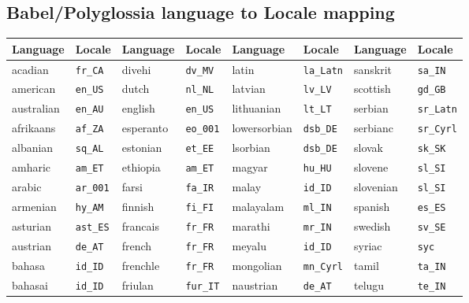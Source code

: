 \documentclass{ltxdockit}
\begin{document}
\subsection{Babel/Polyglossia language to Locale mapping}\label{localemap}

\begin{center}
\footnotesize
\begin{tabular}{alalalal}
\toprule
Language & Locale & Language & Locale & Language & Locale & Language & Locale\\
\midrule
acadian    & \texttt{fr\_CA}  & divehi      & \texttt{dv\_MV}  & latin           & \texttt{la\_Latn} & sanskrit        & \texttt{sa\_IN}\\
american   & \texttt{en\_US}  & dutch       & \texttt{nl\_NL}  & latvian         & \texttt{lv\_LV} &   scottish        & \texttt{gd\_GB}\\
australian & \texttt{en\_AU}  & english     & \texttt{en\_US}  & lithuanian      & \texttt{lt\_LT} &   serbian         & \texttt{sr\_Latn}\\ 
afrikaans  & \texttt{af\_ZA}  & esperanto   & \texttt{eo\_001} & lowersorbian    & \texttt{dsb\_DE} &  serbianc        & \texttt{sr\_Cyrl}\\ 
albanian   & \texttt{sq\_AL}  & estonian    & \texttt{et\_EE}  & lsorbian        & \texttt{dsb\_DE} &  slovak          & \texttt{sk\_SK}\\
amharic    & \texttt{am\_ET}  & ethiopia    & \texttt{am\_ET}  & magyar          & \texttt{hu\_HU} &   slovene         & \texttt{sl\_SI}\\
arabic     & \texttt{ar\_001} & farsi       & \texttt{fa\_IR}  & malay           & \texttt{id\_ID} &   slovenian       & \texttt{sl\_SI}\\
armenian   & \texttt{hy\_AM}  & finnish     & \texttt{fi\_FI}  & malayalam       & \texttt{ml\_IN} &   spanish         & \texttt{es\_ES}\\
asturian   & \texttt{ast\_ES} & francais    & \texttt{fr\_FR}  & marathi         & \texttt{mr\_IN} &   swedish         & \texttt{sv\_SE}\\
austrian   & \texttt{de\_AT}  & french      & \texttt{fr\_FR}  & meyalu          & \texttt{id\_ID} &   syriac          & \texttt{syc}\\
bahasa     & \texttt{id\_ID}  & frenchle    & \texttt{fr\_FR}  & mongolian       & \texttt{mn\_Cyrl} & tamil           & \texttt{ta\_IN}\\
bahasai    & \texttt{id\_ID}  & friulan     & \texttt{fur\_IT} & naustrian       & \texttt{de\_AT} &   telugu          & \texttt{te\_IN}\\

\end{tabular}
\end{center}
\end{document}
